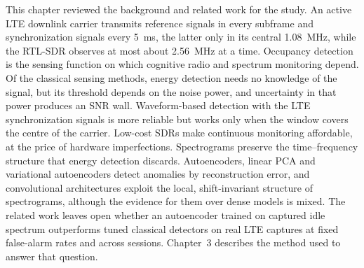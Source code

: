 This chapter reviewed the background and related work for the study. An active LTE downlink carrier transmits reference signals in every subframe and synchronization signals every \qty{5}{\milli\second}, the latter only in its central \qty{1.08}{\mega\hertz}, while the RTL-SDR observes at most about \qty{2.56}{\mega\hertz} at a time. Occupancy detection is the sensing function on which cognitive radio and spectrum monitoring depend. Of the classical sensing methods, energy detection needs no knowledge of the signal, but its threshold depends on the noise power, and uncertainty in that power produces an SNR wall. Waveform-based detection with the LTE synchronization signals is more reliable but works only when the window covers the centre of the carrier. Low-cost SDRs make continuous monitoring affordable, at the price of hardware imperfections. Spectrograms preserve the time--frequency structure that energy detection discards. Autoencoders, linear PCA and variational autoencoders detect anomalies by reconstruction error, and convolutional architectures exploit the local, shift-invariant structure of spectrograms, although the evidence for them over dense models is mixed. The related work leaves open whether an autoencoder trained on captured idle spectrum outperforms tuned classical detectors on real LTE captures at fixed false-alarm rates and across sessions. Chapter~3 describes the method used to answer that question.
